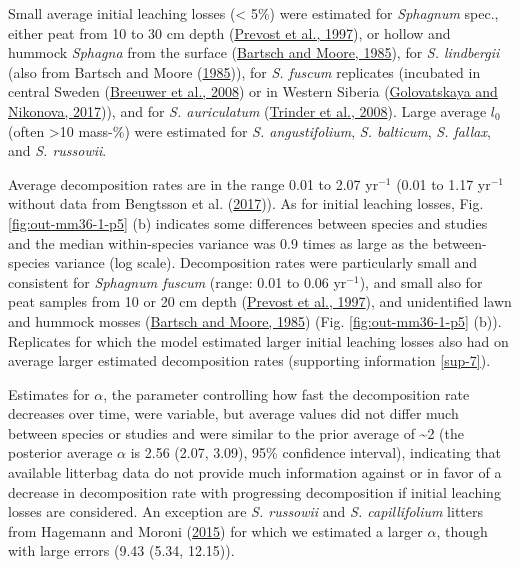 \documentclass[
  12pt,
]{article}
\begin{document}
Small average initial leaching losses (\textless{} 5\%) were estimated for \emph{Sphagnum} spec., either peat from 10 to 30 cm depth (\protect\hyperlink{ref-Prevost.1997}{Prevost et al., 1997}), or hollow and hummock \emph{Sphagna} from the surface (\protect\hyperlink{ref-Bartsch.1985}{Bartsch and Moore, 1985}), for \emph{S. lindbergii} (also from Bartsch and Moore (\protect\hyperlink{ref-Bartsch.1985}{1985})), for \emph{S. fuscum} replicates (incubated in central Sweden (\protect\hyperlink{ref-Breeuwer.2008}{Breeuwer et al., 2008}) or in Western Siberia (\protect\hyperlink{ref-Golovatskaya.2017}{Golovatskaya and Nikonova, 2017})), and for \emph{S. auriculatum} (\protect\hyperlink{ref-Trinder.2008}{Trinder et al., 2008}). Large average \(l_0\) (often \textgreater10 mass-\%) were estimated for \emph{S. angustifolium}, \emph{S. balticum}, \emph{S. fallax}, and \emph{S. russowii}.

Average decomposition rates are in the range 0.01 to 2.07 yr\(^{-1}\) (0.01 to 1.17 yr\(^{-1}\) without data from Bengtsson et al. (\protect\hyperlink{ref-Bengtsson.2017}{2017})). As for initial leaching losses, Fig. \ref{fig:out-mm36-1-p5} (b) indicates some differences between species and studies and the median within-species variance was 0.9 times as large as the between-species variance (log scale). Decomposition rates were particularly small and consistent for \emph{Sphagnum fuscum} (range: 0.01 to 0.06 yr\(^{-1}\)), and small also for peat samples from 10 or 20 cm depth (\protect\hyperlink{ref-Prevost.1997}{Prevost et al., 1997}), and unidentified lawn and hummock mosses (\protect\hyperlink{ref-Bartsch.1985}{Bartsch and Moore, 1985}) (Fig. \ref{fig:out-mm36-1-p5} (b)). Replicates for which the model estimated larger initial leaching losses also had on average larger estimated decomposition rates (supporting information \ref{sup-7}).

Estimates for \(\alpha\), the parameter controlling how fast the decomposition rate decreases over time, were variable, but average values did not differ much between species or studies and were similar to the prior average of \textasciitilde2 (the posterior average \(\alpha\) is 2.56 (2.07, 3.09), 95\% confidence interval), indicating that available litterbag data do not provide much information against or in favor of a decrease in decomposition rate with progressing decomposition if initial leaching losses are considered. An exception are \emph{S. russowii} and \emph{S. capillifolium} litters from Hagemann and Moroni (\protect\hyperlink{ref-Hagemann.2015}{2015}) for which we estimated a larger \(\alpha\), though with large errors (9.43 (5.34, 12.15)).
\end{document}
